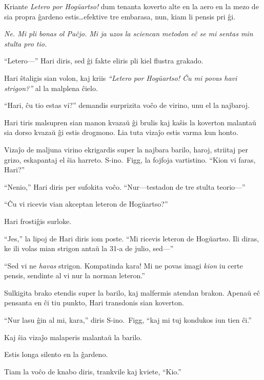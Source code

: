 Kriante \emph{Letero por Hogŭartso!} dum tenanta koverto alte en la aero en la mezo de sia propra ĝardeno estis…efektive tre embarasa, nun, kiam li pensis pri ĝi.

\emph{Ne.
Mi pli bonas ol Paĉjo.
Mi ja uzos la sciencan metodon eĉ se mi sentas min stulta pro tio.}

“Letero—” Hari diris, sed ĝi fakte eliris pli kiel flustra grakado.

Hari ŝtaligis sian volon, kaj kriis \emph{“Letero por Hogŭartso!
Ĉu mi povas havi strigon?”} al la malplena ĉielo.

“Hari, ĉu tio estas vi?” demandis surprizita voĉo de virino, unu el la najbaroj.

Hari tiris malsupren sian manon kvazaŭ ĝi brulis kaj kaŝis la koverton malantaŭ sia dorso kvazaŭ ĝi estis drogmono.
Lia tuta vizaĵo estis varma kun honto.

Vizaĵo de maljuna virino ekrigardis super la najbara barilo, haroj, striitaj per grizo, eskapantaj el ŝia harreto.
S\nobreakdash-ino.~Figg, la fojfoja vartistino.
“Kion vi faras, Hari?”

“Nenio,” Hari diris per sufokita voĉo.
“Nur—testadon de tre stulta teorio—”

“Ĉu vi ricevis vian akceptan leteron de Hogŭartso?”

Hari frostiĝis surloke.

“Jes,” la lipoj de Hari diris iom poste.
“Mi ricevis leteron de Hogŭartso.
Ili diras, ke ili volas mian strigon antaŭ la 31-a de julio, sed—”

“Sed vi ne \emph{havas} strigon.
Kompatinda kara!
Mi ne povas imagi \emph{kion} iu certe pensis, sendinte al vi nur la norman leteron.”

Sulkigita brako etendis super la barilo, kaj malfermis atendan brakon.
Apenaŭ eĉ pensanta en ĉi tiu punkto, Hari transdonis sian koverton.

“Nur lasu ĝin al mi, kara,” diris S\nobreakdash-ino.~Figg, “kaj mi tuj kondukos iun tien ĉi.”

Kaj ŝia vizaĵo malaperis malantaŭ la barilo.

Estis longa silento en la ĝardeno.

Tiam la voĉo de knabo diris, trankvile kaj kviete, “Kio.”
